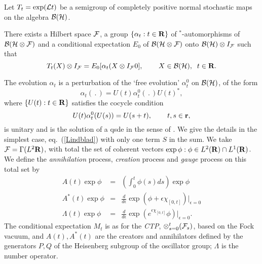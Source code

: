 Let $T_t=\exp({\cal L}t)$ be a semigroup of completely positive normal
stochastic maps on the algebra ${\cal B}({\cal H})$.
\begin{theorem}
There exists a Hilbert space ${\cal F}$, a group $\{\alpha_t:t\in{\bf R}\}$
of $^*$-automorphisms of ${\cal B}({\cal H}\otimes{\cal F})$ and a
conditional expectation $E_0$ of ${\cal B}({\cal H}\otimes{\cal F})$
onto ${\cal B}({\cal H})\otimes I_{\cal F}$ such that
\begin{equation}
T_t(X)\otimes I_{\cal F}=E_0[\alpha_t(X\otimes I_{\cal F}0],\hspace{.3in}
X\in{\cal B}({\cal H}),\;\;t\in{\bf R}.
\end{equation}
\end{theorem}
The evolution $\alpha_t$ is a perturbation of the `free evolution'
$\alpha_t^0$ on ${\cal B}({\cal H})$, of the form
\begin{equation}
\alpha_t(\,.\,)=U(t)\alpha_t^0(\,.\,)U(t)^*,
\end{equation}
where $\{U(t):t\in{\bf R}\}$ satisfies the cocycle condition
\begin{equation}
U(t)\alpha_t^0(U(s))=U(s+t),\hspace{.3in}t,s\in{\bf r},
\end{equation}
is unitary and is the solution of a qsde in the sense of
\cite{Hudson3,Partha2}. We give the details in the simplest case,
eq.~(\ref{Lindblad}) with only one term $S$ in the sum. We take ${\cal F}=
\Gamma(L^2{\bf R})$, with total the set of coherent vectors $\exp\phi:\phi
\in L^2({\bf R})\cap L^1({\bf R})$. We define the {\em annihilation} process,
{\em creation} process and {\em gauge} process on this total set by
\begin{eqnarray}
A(t)\exp\phi&=&(\int_0^t\phi(s)ds)\exp\phi\\
A^*(t)\exp\phi&=&\frac{d}{d\epsilon}\exp\left(\phi+\epsilon\chi_{[0,t]}
\right)|_{\epsilon=0}\\
\Lambda(t)\exp\phi&=&\frac{d}{d\epsilon}\exp\left(e^{\epsilon\chi_{[0,t]}}
\phi\right)|_{\epsilon=0}.
\end{eqnarray}
The conditional expectation $M_t$ is as for the {\em CTP},
$\otimes_{s=0}^t({\cal F}_s)$, based on the Fock vacuum, and
$A(t),A^*(t)$ are the creators and annihilators defined by
the generators $P,Q$ of the Heisenberg
subgroup of the oscillator group; $\Lambda$ is the number operator.

